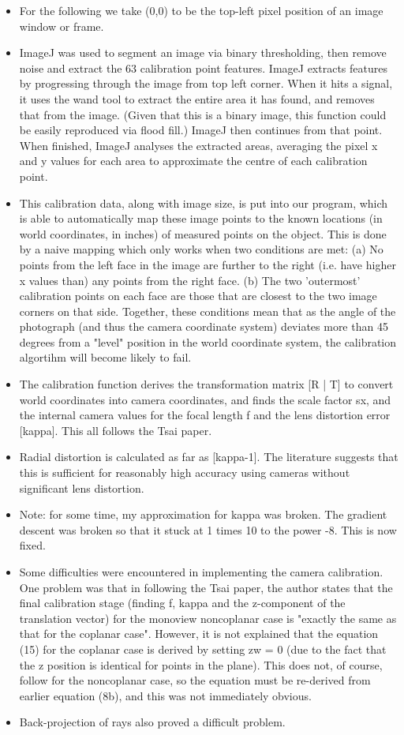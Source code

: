 \begin{itemize}
  \item For the following we take (0,0) to be the top-left pixel position of an image window or frame.
  \item ImageJ was used to segment an image via binary thresholding, then remove noise and extract the 63 calibration point features. ImageJ extracts features by progressing through the image from top left corner. When it hits a signal, it uses the wand tool to extract the entire area it has found, and removes that from the image. (Given that this is a binary image, this function could be easily reproduced via flood fill.) ImageJ then continues from that point. When finished, ImageJ analyses the extracted areas, averaging the pixel x and y values for each area to approximate the centre of each calibration point.
  \item This calibration data, along with image size, is put into our program, which is able to automatically map these image points to the known locations (in world coordinates, in inches) of measured points on the object. This is done by a naive mapping which only works when two conditions are met: (a) No points from the left face in the image are further to the right (i.e. have higher x values than) any points from the right face. (b) The two 'outermost' calibration points on each face are those that are closest to the two image corners on that side. Together, these conditions mean that as the angle of the photograph (and thus the camera coordinate system) deviates more than 45 degrees from a "level" position in the world coordinate system, the calibration algortihm will become likely to fail.
  \item The calibration function derives the transformation matrix [R | T] to convert world coordinates into camera coordinates, and finds the scale factor sx, and the internal camera values for the focal length f and the lens distortion error [kappa]. This all follows the Tsai paper.
  \item Radial distortion is calculated as far as [kappa-1]. The literature suggests that this is sufficient for reasonably high accuracy using cameras without significant lens distortion.
  \item Note: for some time, my approximation for kappa was broken. The gradient descent was broken so that it stuck at 1 times 10 to the power -8. This is now fixed.
  \item Some difficulties were encountered in implementing the camera calibration. One problem was that in following the Tsai paper, the author states that the final calibration stage (finding f, kappa and the z-component of the translation vector) for the monoview noncoplanar case is "exactly the same as that for the coplanar case". However, it is not explained that the equation (15) for the coplanar case is derived by setting zw = 0 (due to the fact that the z position is identical for points in the plane). This does not, of course, follow for the noncoplanar case, so the equation must be re-derived from earlier equation (8b), and this was not immediately obvious.
  \item Back-projection of rays also proved a difficult problem.
\end{itemize}
